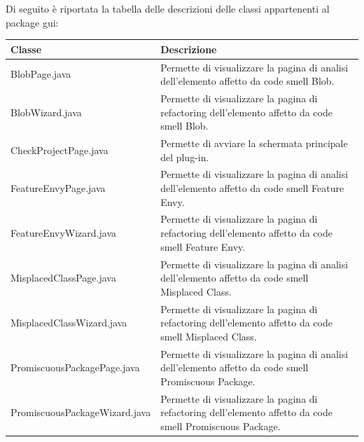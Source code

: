 \documentclass[11pt]{article}
\begin{document}
		\begin{description}
			\item Di seguito è riportata la tabella delle descrizioni delle classi appartenenti al package gui:
			\item \begin{tabular}{|p{}|p{}|}
				\hline
				\textbf{Classe} & \textbf{Descrizione}\\
				\hline
				BlobPage.java & Permette di visualizzare la pagina di analisi dell'elemento affetto da code smell Blob.  \\
				\hline
				BlobWizard.java & Permette di visualizzare la pagina di refactoring dell'elemento affetto da code smell Blob.\\
				\hline
				CheckProjectPage.java & Permette di avviare la schermata principale del plug-in.\\
				\hline
				FeatureEnvyPage.java & Permette di visualizzare la pagina di analisi dell'elemento affetto da code smell Feature Envy. \\
				\hline
				FeatureEnvyWizard.java & Permette di visualizzare la pagina di refactoring dell'elemento affetto da code smell Feature Envy.\\
				\hline
				MisplacedClassPage.java & Permette di  visualizzare la pagina di analisi dell'elemento affetto da code smell Misplaced Class.\\
				\hline
				MisplacedClassWizard.java & Permette di visualizzare la pagina di refactoring dell'elemento affetto da code smell Misplaced Class.\\
				\hline
				PromiscuousPackagePage.java & Permette di  visualizzare la pagina di analisi dell'elemento affetto da code smell Promiscuous Package.\\
				\hline
				PromiscuousPackageWizard.java & Permette di visualizzare la pagina di refactoring dell'elemento affetto da code smell Promiscuous Package.\\
				\hline
			\end{tabular}


\end{description}
\end{document}
